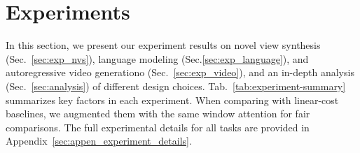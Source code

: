 \section{Experiments} \label{sec:experiments}
\vspace{-0.3em}
In this section, we present our experiment results on novel view synthesis (Sec.~\ref{sec:exp_nvs}),
language modeling (Sec.\ref{sec:exp_language}), and autoregressive video generationo (Sec.~\ref{sec:exp_video}), and an in-depth analysis (Sec.~\ref{sec:analysis}) of different design choices.
Tab.~\ref{tab:experiment-summary} summarizes key factors in each experiment. 
When comparing with linear-cost baselines, we augmented them with the same window attention for fair comparisons. 
The full experimental details for all tasks are provided in Appendix~\ref{sec:appen_experiment_details}.
\vspace{-0.3em}




\begin{table}[t!]
  \caption{Summary of our experiments on three different data structures. `d' denotes model dimension. The state size denotes the size of the fast weight per model block.}
  \centering
  \scriptsize
  \vspace{-0.2in}
  \label{tab:experiment-summary}
\end{table}


